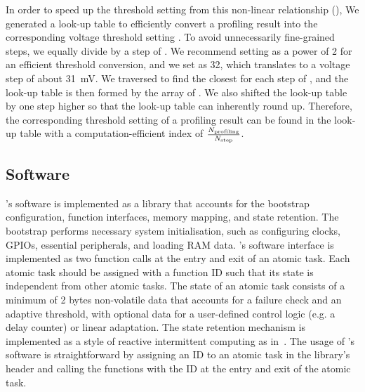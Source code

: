 In order to speed up the threshold setting from this non-linear relationship (), We generated a look-up table to efficiently convert a profiling result  into the corresponding voltage threshold setting . 
To avoid unnecessarily fine-grained steps, we equally divide  by a step of . We recommend setting  as a power of 2 for an efficient threshold conversion, and we set  as 32, which translates to a voltage step of about \SI{31}{\milli\volt}.
We traversed  to find the closest  for each step of , and the look-up table is then formed by the array of . 
We also shifted the look-up table by one step higher so that the look-up table can inherently round up. 
Therefore, the corresponding threshold setting  of a profiling result  can be found in the look-up table with a computation-efficient index of $\frac{N_{\text{profiling}}}{N_{\text{step}}}$.

\subsection{Software}

\nn{}'s software is implemented as a library that accounts for the bootstrap configuration, function interfaces, memory mapping, and state retention. 
The bootstrap performs necessary system initialisation, such as configuring clocks, GPIOs, essential peripherals, and loading RAM data. 
\nn{}'s software interface is implemented as two function calls at the entry and exit of an atomic task. 
Each atomic task should be assigned with a function ID such that its state is independent from other atomic tasks. 
The state of an atomic task consists of a minimum of 2 bytes non-volatile data that accounts for a failure check and an adaptive threshold, with optional data for a user-defined control logic (e.g. a delay counter) or linear adaptation. 
The state retention mechanism is implemented as a style of reactive intermittent computing as in~\cite{balsamo2015hibernus, jayakumar2014quickrecall}.
The usage of \nn{}'s software is straightforward by assigning an ID to an atomic task in the library's header and calling the functions with the ID at the entry and exit of the atomic task. 
